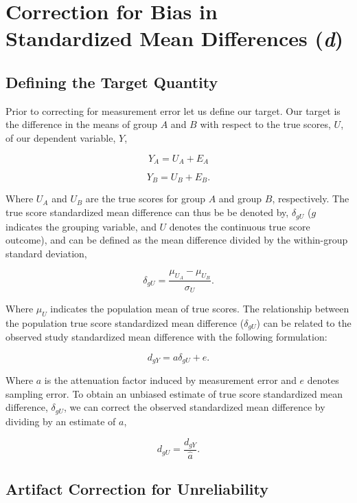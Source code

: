 \documentclass[
  letterpaper,
  DIV=11,
  numbers=noendperiod]{scrreprt}
\begin{document}
\section{\texorpdfstring{Correction for Bias in Standardized Mean
Differences
(\emph{d})}{Correction for Bias in Standardized Mean Differences (d)}}\label{correction-for-bias-in-standardized-mean-differences-d}

\subsection{Defining the Target
Quantity}\label{defining-the-target-quantity-2}

Prior to correcting for measurement error let us define our target. Our
target is the difference in the means of group \(A\) and \(B\) with
respect to the true scores, \(U\), of our dependent variable, \(Y\),

\[
Y_A = U_A + E_A
\]

\[
Y_B = U_B + E_B.
\]

Where \(U_A\) and \(U_B\) are the true scores for group \(A\) and group
\(B\), respectively. The true score standardized mean difference can
thus be be denoted by, \(\delta_{gU}\) (\(g\) indicates the grouping
variable, and \(U\) denotes the continuous true score outcome), and can
be defined as the mean difference divided by the within-group standard
deviation,

\[
\delta_{gU} = \frac{\mu_{U_A} - \mu_{U_B}}{\sigma_{U}}.
\]

Where \(\mu_U\) indicates the population mean of true scores. The
relationship between the population true score standardized mean
difference (\(\delta_{gU}\)) can be related to the observed study
standardized mean difference with the following formulation:

\[
d_{gY} = a\delta_{gU}+e.
\]

Where \(a\) is the attenuation factor induced by measurement error and
\(e\) denotes sampling error. To obtain an unbiased estimate of true
score standardized mean difference, \(\delta_{gU}\), we can correct the
observed standardized mean difference by dividing by an estimate of
\(a\),

\[
d_{gU} = \frac{d_{gY}}{\hat{a}}.
\]

\subsection{Artifact Correction for Unreliability}\label{sec-d-SMD}
\end{document}

